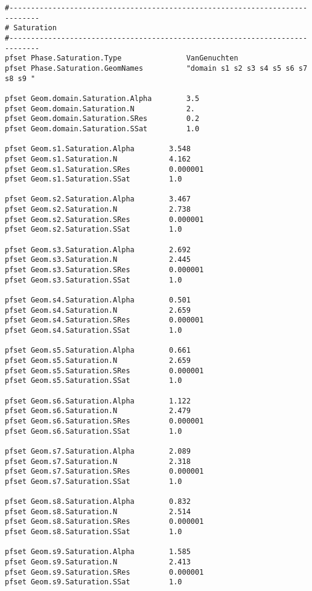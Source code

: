 \begin{verbatim}
#-----------------------------------------------------------------------------
# Saturation
#-----------------------------------------------------------------------------
pfset Phase.Saturation.Type               VanGenuchten
pfset Phase.Saturation.GeomNames          "domain s1 s2 s3 s4 s5 s6 s7 s8 s9 "

pfset Geom.domain.Saturation.Alpha        3.5
pfset Geom.domain.Saturation.N            2.
pfset Geom.domain.Saturation.SRes         0.2
pfset Geom.domain.Saturation.SSat         1.0

pfset Geom.s1.Saturation.Alpha        3.548
pfset Geom.s1.Saturation.N            4.162
pfset Geom.s1.Saturation.SRes         0.000001
pfset Geom.s1.Saturation.SSat         1.0

pfset Geom.s2.Saturation.Alpha        3.467
pfset Geom.s2.Saturation.N            2.738
pfset Geom.s2.Saturation.SRes         0.000001
pfset Geom.s2.Saturation.SSat         1.0

pfset Geom.s3.Saturation.Alpha        2.692
pfset Geom.s3.Saturation.N            2.445
pfset Geom.s3.Saturation.SRes         0.000001
pfset Geom.s3.Saturation.SSat         1.0

pfset Geom.s4.Saturation.Alpha        0.501
pfset Geom.s4.Saturation.N            2.659
pfset Geom.s4.Saturation.SRes         0.000001
pfset Geom.s4.Saturation.SSat         1.0

pfset Geom.s5.Saturation.Alpha        0.661
pfset Geom.s5.Saturation.N            2.659
pfset Geom.s5.Saturation.SRes         0.000001
pfset Geom.s5.Saturation.SSat         1.0

pfset Geom.s6.Saturation.Alpha        1.122
pfset Geom.s6.Saturation.N            2.479
pfset Geom.s6.Saturation.SRes         0.000001
pfset Geom.s6.Saturation.SSat         1.0

pfset Geom.s7.Saturation.Alpha        2.089
pfset Geom.s7.Saturation.N            2.318
pfset Geom.s7.Saturation.SRes         0.000001
pfset Geom.s7.Saturation.SSat         1.0

pfset Geom.s8.Saturation.Alpha        0.832
pfset Geom.s8.Saturation.N            2.514
pfset Geom.s8.Saturation.SRes         0.000001
pfset Geom.s8.Saturation.SSat         1.0

pfset Geom.s9.Saturation.Alpha        1.585
pfset Geom.s9.Saturation.N            2.413
pfset Geom.s9.Saturation.SRes         0.000001
pfset Geom.s9.Saturation.SSat         1.0
\end{verbatim}

